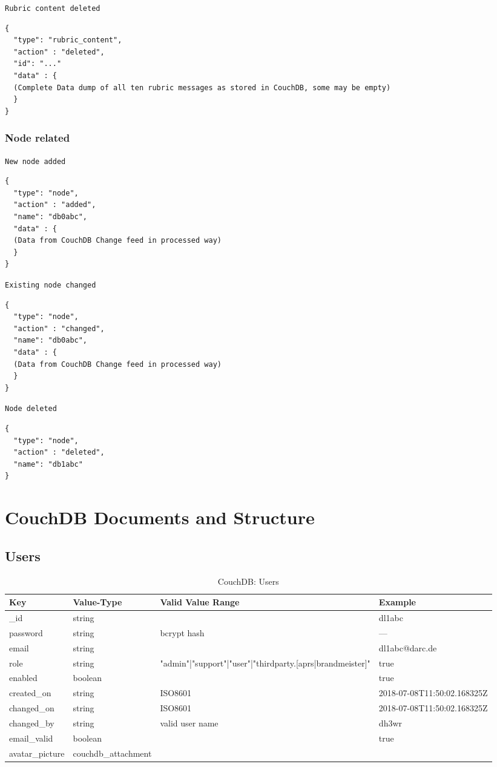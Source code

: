 \texttt{Rubric content deleted}
\begin{lstlisting}
{
  "type": "rubric_content",
  "action" : "deleted",
  "id": "..."
  "data" : {
  (Complete Data dump of all ten rubric messages as stored in CouchDB, some may be empty)
  }
}
\end{lstlisting}


\subsubsection{Node related}
\texttt{New node added}
\begin{lstlisting}
{
  "type": "node",
  "action" : "added",
  "name": "db0abc",
  "data" : {
  (Data from CouchDB Change feed in processed way)
  }
}
\end{lstlisting}

\texttt{Existing node changed}
\begin{lstlisting}
{
  "type": "node",
  "action" : "changed",
  "name": "db0abc",
  "data" : {
  (Data from CouchDB Change feed in processed way)
  }
}
\end{lstlisting}

\texttt{Node deleted}
\begin{lstlisting}
{
  "type": "node",
  "action" : "deleted",
  "name": "db1abc"
}
\end{lstlisting}


\section{CouchDB Documents and Structure}

\subsection{Users}

\begin{table}[h]
 \centering
 \caption{CouchDB: Users}
 \begin{tabular}{|l|l|l|l|} \hline
  Key & Value-Type & Valid Value Range & Example \\
  \hline
  \_id & string & & dl1abc \\
  password & string & bcrypt hash & --- \\
  email & string & & dl1abc@darc.de \\
  role & string & "admin"|"support"|"user"|"thirdparty.[aprs|brandmeister]" & true \\
  enabled & boolean & & true \\
  created\_on & string & ISO8601 & 2018-07-08T11:50:02.168325Z \\
  changed\_on & string & ISO8601 & 2018-07-08T11:50:02.168325Z \\
  changed\_by & string & valid user name & dh3wr \\
  email\_valid & boolean & & true \\
  avatar\_picture & couchdb\_attachment & & \\ \hline
  \end{tabular}
  \label{tab:couchdb:users}
\end{table}

